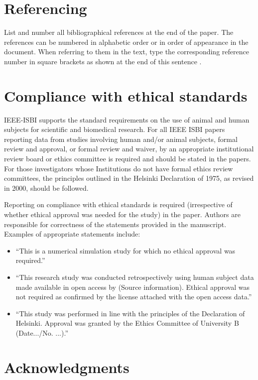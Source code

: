 \documentclass{article}
\begin{document}
\section{Referencing}
\label{sec:ref}

List and number all bibliographical references at the end of the
paper.  The references can be numbered in alphabetic order or in order
of appearance in the document.  When referring to them in the text,
type the corresponding reference number in square brackets as shown at
the end of this sentence \cite{C2}.

\section{Compliance with ethical standards}
\label{sec:ethics}

IEEE-ISBI supports the standard requirements on the use of animal and
human subjects for scientific and biomedical research. For all IEEE
ISBI papers reporting data from studies involving human and/or
animal subjects, formal review and approval, or formal review and
waiver, by an appropriate institutional review board or ethics
committee is required and should be stated in the papers. For those
investigators whose Institutions do not have formal ethics review
committees, the principles  outlined in the Helsinki Declaration of
1975, as revised in 2000, should be followed.

Reporting on compliance with ethical standards is required
(irrespective of whether ethical approval was needed for the study) in
the paper. Authors are responsible for correctness of the statements
provided in the manuscript. Examples of appropriate statements
include:
\begin{itemize}
  \item ``This is a numerical simulation study for which no ethical
    approval was required.'' 
  \item ``This research study was conducted retrospectively using
    human subject data made available in open access by (Source
    information). Ethical approval was not required as confirmed by
    the license attached with the open access data.''
    \item ``This study was performed in line with the principles of
      the Declaration of Helsinki. Approval was granted by the Ethics
      Committee of University B (Date.../No. ...).''
\end{itemize}


\section{Acknowledgments}
\label{sec:acknowledgments}
\end{document}
